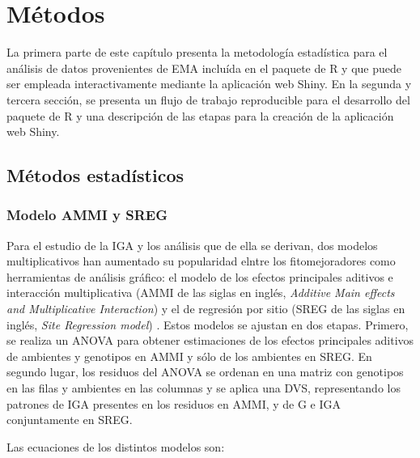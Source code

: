 
\chapter{Métodos}

La primera parte de este capítulo presenta la metodología estadística para el análisis de datos provenientes de EMA incluída en el paquete de R y que puede ser empleada interactivamente mediante la aplicación web Shiny. En la segunda y tercera sección, se presenta un flujo de trabajo reproducible para el desarrollo del paquete de R y una descripción de las etapas para la creación de la aplicación web Shiny.


\section{Métodos estadísticos}

\subsection{Modelo AMMI y SREG}
Para el estudio de la IGA y los análisis que de ella se derivan, dos modelos multiplicativos han aumentado su popularidad elntre los fitomejoradores como herramientas de análisis gráfico: el modelo de los efectos principales aditivos e interacción multiplicativa (AMMI de las siglas en inglés, \emph{Additive Main effects and Multiplicative Interaction}) \citep{Gauch1988, Gauch1992} y el de regresión por sitio (SREG de las siglas en inglés, \emph{Site Regression model}) \citep{Corneliusetal1996, CrossaCornelius1997}. Estos modelos se ajustan en dos etapas. Primero, se realiza un ANOVA para obtener estimaciones de los efectos principales aditivos de ambientes y genotipos en AMMI y sólo de los ambientes en SREG. En segundo lugar, los residuos del ANOVA se ordenan en una matriz con genotipos en las filas y ambientes en las columnas y se aplica una DVS, representando los patrones de IGA presentes en los residuos en AMMI, y de G e IGA conjuntamente en SREG.

Las ecuaciones de los distintos modelos son:

